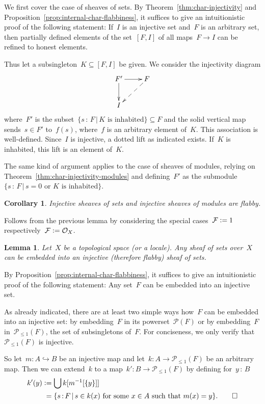 \documentclass[10pt,reqno,a4paper]{amsbook}
\makeatletter
\theoremstyle{definition}
\theoremstyle{plain}
\newtheorem{cor}[defn]{Corollary}
\newtheorem{lemma}[defn]{Lemma}
\theoremstyle{remark}
\newcommand{\F}{\mathcal{F}}
\renewcommand{\O}{\mathcal{O}}
\renewcommand{\P}{\mathcal{P}}
\newcommand{\?}{\,{:}\,}
\renewcommand{\_}{\mathpunct{.}\,}
\newcommand{\defeq}{\vcentcolon=}
\renewenvironment{proof}[1][\proofname]{\par
  \pushQED{\qed}%
  \normalfont \topsep6\p@\@plus6\p@\relax
  \trivlist
  \item[\hskip\labelsep
        \itshape
    #1\@addpunct{.}]\ignorespaces
}{%
  \popQED\endtrivlist\@endpefalse
}
\makeatother
\begin{document}
\begin{proof}
We first cover the case of sheaves of sets. By Theorem~\ref{thm:char-injectivity}
and Proposition~\ref{prop:internal-char-flabbiness}, it suffices to give an
intuitionistic proof of the following statement: If~$I$ is an injective set
and~$F$ is an arbitrary set, then partially defined elements of the set~$[F,I]$
of all maps~$F \to I$ can be refined to honest elements.

Thus let a subsingleton~$K \subseteq [F,I]$ be given. We consider the
injectivity diagram
\[ \xymatrix{
  F' \ar[r]\ar[d] & F \ar@{-->}[ld] \\
  I
} \]
where~$F'$ is the subset~$\{ s \? F \,|\, \text{$K$ is inhabited} \} \subseteq F$ and the
solid vertical map sends~$s \in F'$ to~$f(s)$, where~$f$ is an arbitrary element
of~$K$. This association is well-defined. Since~$I$ is injective, a dotted lift
as indicated exists. If~$K$ is inhabited, this lift is an element of~$K$.

The same kind of argument applies to the case of sheaves of modules, relying on
Theorem~\ref{thm:char-injectivity-modules} and defining~$F'$ as the
submodule~$\{ s \? F \,|\, \text{$s = 0$ or $K$ is inhabited} \}$.
\end{proof}

\begin{cor}Injective sheaves of sets and injective sheaves of modules are
flabby.\end{cor}

\begin{proof}Follows from the previous lemma by considering the special cases~$\F
\defeq 1$ respectively~$\F \defeq \O_X$.\end{proof}

\begin{lemma}\label{lemma:enough-flabby}
Let~$X$ be a topological space (or a locale). Any sheaf of sets
over~$X$ can be embedded into an injective (therefore flabby) sheaf of sets.
\end{lemma}

\begin{proof}By Proposition~\ref{prop:internal-char-flabbiness}, it suffices to
give an intuitionistic proof of the following statement: Any set~$F$ can be
embedded into an injective set.

As already indicated, there are at least two simple ways how~$F$ can be embedded
into an injective set: by embedding~$F$ in its powerset~$\P(F)$ or by
embedding~$F$ in~$\P_{\leq1}(F)$, the set of subsingletons of~$F$. For
conciseness, we only verify that~$\P_{\leq1}(F)$ is injective.

So let~$m : A \hookrightarrow B$ be an injective map and let~$k : A \to
\P_{\leq1}(F)$ be an arbitrary map. Then we can extend~$k$ to a map~$k' : B \to
\P_{\leq1}(F)$ by defining for~$y \? B$
\begin{align*}
  k'(y) &\defeq \bigcup k[m^{-1}[\{y\}]] \\
  &\phantom{\vcentcolon}= \{ s\?F \,|\, \text{$s \in k(x)$ for some~$x \in A$ such that~$m(x) = y$} \}.
  \qedhere
\end{align*}
\end{proof}
\end{document}
